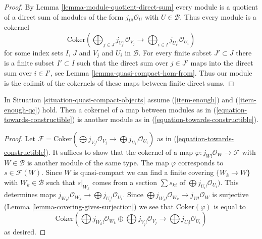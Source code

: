 \begin{proof}
By Lemma \ref{lemma-module-quotient-direct-sum}
every module is a quotient of a direct sum of modules of the form
$j_{U!}\mathcal{O}_U$ with $U \in \mathcal{B}$. Thus every module
is a cokernel
$$
\text{Coker}\left(
\bigoplus\nolimits_{j \in J} j_{V_j!}\mathcal{O}_{V_j}
\longrightarrow
\bigoplus\nolimits_{i \in I} j_{U_i!}\mathcal{O}_{U_i}
\right)
$$
for some index sets $I$, $J$ and $V_j$ and $U_i$ in $\mathcal{B}$.
For every finite subset $J' \subset J$ there is a finite subset
$I' \subset I$ such that the direct sum over $j \in J'$ maps into
the direct sum over $i \in I'$, see
Lemma \ref{lemma-quasi-compact-hom-from}.
Thus our module is the colimit of the cokernels of these maps
between finite direct sums.
\end{proof}

\begin{lemma}
\label{lemma-cokernel-map-towards-constructibles}
In Situation \ref{situation-quasi-compact-objects} assume
(\ref{item-enough}) and (\ref{item-enough-qc}) hold. Then
a cokernel of a map between modules as in
(\ref{equation-towards-constructible}) is another module as
in (\ref{equation-towards-constructible}).
\end{lemma}

\begin{proof}
Let $\mathcal{F} = \text{Coker}(\bigoplus j_{V_j!}\mathcal{O}_{V_j} \to
\bigoplus j_{U_i!}\mathcal{O}_{U_i})$
as in (\ref{equation-towards-constructible}). It suffices to show
that the cokernel of a map $\varphi : j_{W!}\mathcal{O}_W \to \mathcal{F}$
with $W \in \mathcal{B}$ is another module of the same type.
The map $\varphi$ corresponds to $s \in \mathcal{F}(W)$.
Since $W$ is quasi-compact we can find a finite covering
$\{W_k \to W\}$ with $W_k \in \mathcal{B}$ such that $s|_{W_k}$
comes from a section $\sum s_{ki}$ of $\bigoplus j_{U_i!}\mathcal{O}_{U_i})$.
This determines maps
$j_{W_k!}\mathcal{O}_{W_k} \to \bigoplus j_{U_i!}\mathcal{O}_{U_i}$.
Since $\bigoplus j_{W_k!}\mathcal{O}_{W_k} \to j_{W!}\mathcal{O}_W$
is surjective (Lemma \ref{lemma-covering-gives-surjection})
we see that $\text{Coker}(\varphi)$ is equal to
$$
\text{Coker}\left(
\bigoplus j_{W_k!}\mathcal{O}_{W_k} \oplus
\bigoplus j_{V_j!}\mathcal{O}_{V_j}
\longrightarrow
\bigoplus j_{U_i!}\mathcal{O}_{U_i}
\right)
$$
as desired.
\end{proof}

